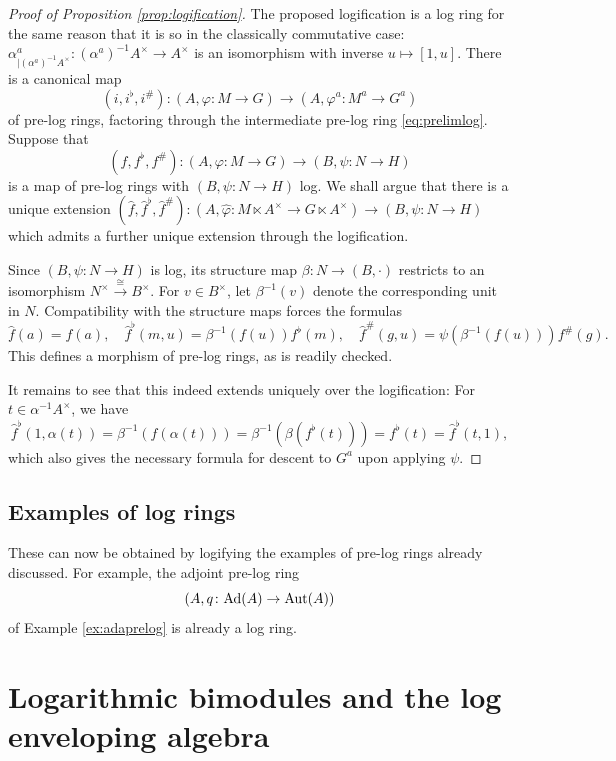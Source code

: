 \documentclass[a4paper,10pt%
]{amsart}
\numberwithin{equation}{section}
\theoremstyle{definition}
\renewcommand{\:}{\colon}
\begin{document}
\begin{proof}[Proof of Proposition \ref{prop:logification}] The proposed logification is a log ring for the same reason that it is so in the classically commutative case: $\alpha^a_{|(\alpha^a)^{-1}A^\times} \colon (\alpha^a)^{-1}A^\times \to A^\times$ is an isomorphism with inverse $u \mapsto [1, u]$. There is a canonical map \[(i, i^\flat, i^\#) \colon (A, \varphi \colon M \to G) \to (A, \varphi^a \colon M^a \to G^a)\] of pre-log rings, factoring through the intermediate pre-log ring \eqref{eq:prelimlog}. Suppose that \[(f, f^\flat, f^\#) \colon (A, \varphi \colon M \to G) \to (B, \psi \colon N \to H)\] is a map of pre-log rings with $(B, \psi \colon N \to H)$ log. We shall argue that there is a unique extension $(\hat{f}, \hat{f}^\flat, \hat{f}^\#) \colon (A, \hat{\varphi} \colon M \ltimes A^\times \to G \ltimes A^\times) \to (B, \psi \colon N \to H)$ which admits a further unique extension through the logification. 

Since $(B, \psi \colon N \to H)$ is log, its structure map $\beta \colon N \to (B, \cdot)$ restricts to an isomorphism $N^\times \xrightarrow{\cong} B^\times$. For $v \in B^\times$, let $\beta^{-1}(v)$ denote the corresponding unit in $N$. Compatibility with the structure maps forces the formulas \[\hat{f}(a) = f(a), \quad \hat{f}^\flat(m, u) = \beta^{-1}(f(u))f^\flat(m), \quad \hat{f}^\#(g, u) = \psi(\beta^{-1}(f(u)))f^\#(g).\] This defines a morphism of pre-log rings, as is readily checked. 

It remains to see that this indeed extends uniquely over the logification: For $t \in \alpha^{-1}A^\times$, we have \[\hat{f}^\flat(1, \alpha(t)) = \beta^{-1}(f(\alpha(t))) = \beta^{-1}(\beta(f^\flat(t))) = f^\flat(t) = \hat{f}^\flat(t, 1),\] which also gives the necessary formula for descent to $G^a$ upon applying $\psi$.
\end{proof}

\subsection{Examples of log rings} These can now be obtained by logifying the examples of pre-log rings already discussed. For example, the adjoint pre-log ring \[(A, q \colon {\rm Ad}(A) \to {\rm Aut}(A))\] of Example \ref{ex:adaprelog} is already a log ring. 

\section{Logarithmic bimodules and the log enveloping algebra}\label{sec:logenv}
\end{document}
